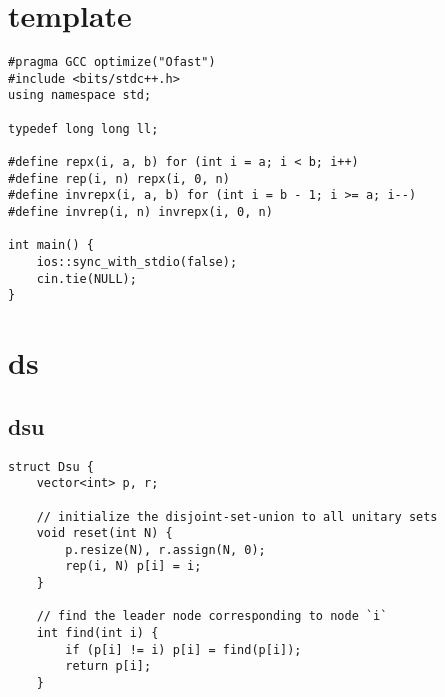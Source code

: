 \documentclass[twoside]{article}
\begin{document}
\scriptsize
\begin{multicols*}{2}
{
\section*{template}
}
\begin{verbatim}
#pragma GCC optimize("Ofast")
#include <bits/stdc++.h>
using namespace std;

typedef long long ll;

#define repx(i, a, b) for (int i = a; i < b; i++)
#define rep(i, n) repx(i, 0, n)
#define invrepx(i, a, b) for (int i = b - 1; i >= a; i--)
#define invrep(i, n) invrepx(i, 0, n)

int main() {
    ios::sync_with_stdio(false);
    cin.tie(NULL);
}
\end{verbatim}

{
[\vspace{2em}]
\section*{ds}
}
{
\subsection*{dsu}
}
\begin{verbatim}
struct Dsu {
    vector<int> p, r;

    // initialize the disjoint-set-union to all unitary sets
    void reset(int N) {
        p.resize(N), r.assign(N, 0);
        rep(i, N) p[i] = i;
    }

    // find the leader node corresponding to node `i`
    int find(int i) {
        if (p[i] != i) p[i] = find(p[i]);
        return p[i];
    }


\end{verbatim}
\end{multicols*}
\end{document}

